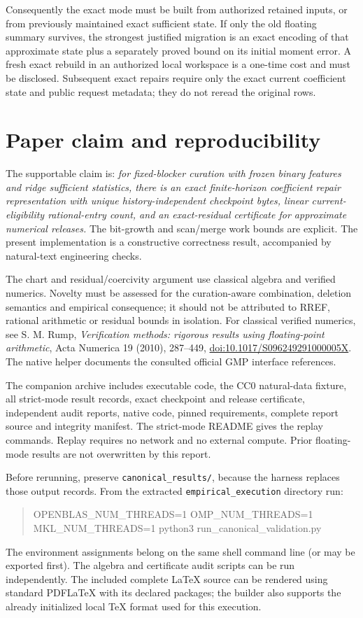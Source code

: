 \documentclass[11pt,a4paper]{article}
\begin{document}
Consequently the exact mode must be built from authorized retained inputs,
or from previously maintained exact sufficient state. If only the old
floating summary survives, the strongest justified migration is an exact
encoding of that approximate state plus a separately proved bound on its
initial moment error. A fresh exact rebuild in an authorized local
workspace is a one-time cost and must be disclosed. Subsequent exact
repairs require only the exact current coefficient state and public request
metadata; they do not reread the original rows.

\clearpage
\section*{Paper claim and reproducibility}
The supportable claim is: \emph{for fixed-blocker curation with frozen binary
features and ridge sufficient statistics, there is an exact finite-horizon
coefficient repair representation with unique history-independent checkpoint
bytes, linear current-eligibility rational-entry count, and an exact-residual
certificate for approximate numerical releases.} The bit-growth and scan/merge
work bounds are explicit. The present implementation is a constructive
correctness result, accompanied by natural-text engineering checks.

The chart and residual/coercivity argument use classical algebra and verified
numerics. Novelty must be assessed for the curation-aware combination, deletion
semantics and empirical consequence; it should not be attributed to RREF,
rational arithmetic or residual bounds in isolation. For classical verified
numerics, see S. M. Rump, \emph{Verification methods: rigorous results using
floating-point arithmetic}, Acta Numerica 19 (2010), 287--449,
\href{https://doi.org/10.1017/S096249291000005X}{doi:10.1017/S096249291000005X}.
The native helper documents the consulted official GMP interface references.

The companion archive includes executable code, the CC0 natural-data fixture,
all strict-mode result records, exact checkpoint and release certificate,
independent audit reports, native code, pinned requirements, complete
report source and integrity manifest. The strict-mode README gives the replay
commands. Replay requires no network and no external compute. Prior floating-mode
results are not overwritten by this report.

Before rerunning, preserve \texttt{canonical\_results/}, because the harness
replaces those output records. From the extracted \texttt{empirical\_execution}
directory run:
\begin{quote}\small\ttfamily
OPENBLAS\_NUM\_THREADS=1 OMP\_NUM\_THREADS=1\\
MKL\_NUM\_THREADS=1 python3 run\_canonical\_validation.py
\end{quote}
The environment assignments belong on the same shell command line (or may be
exported first). The algebra and certificate audit scripts can be run
independently. The included complete \LaTeX{} source can be rendered using
standard PDFLaTeX with its declared packages; the builder also supports the
already initialized local TeX format used for this execution.
\end{document}
